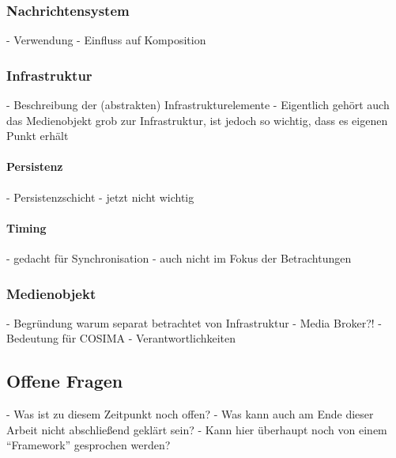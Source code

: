 
\subsubsection{Nachrichtensystem} %
\label{ssub:nachrichtensystem}

  - Verwendung
  - Einfluss auf Komposition


\subsubsection{Infrastruktur} %
\label{ssub:infrastruktur}

  - Beschreibung der (abstrakten) Infrastrukturelemente
  - Eigentlich gehört auch das Medienobjekt grob zur Infrastruktur, ist jedoch so wichtig, dass es eigenen Punkt erhält

\paragraph{Persistenz} %
\label{par:persistenz}

  - Persistenzschicht
  - jetzt nicht wichtig


\paragraph{Timing} %
\label{par:timing}

  - gedacht für Synchronisation
  - auch nicht im Fokus der Betrachtungen



\subsubsection{Medienobjekt} %
\label{ssub:medienobjekt}

  - Begründung warum separat betrachtet von Infrastruktur
  - Media Broker?!
  - Bedeutung für COSIMA
  - Verantwortlichkeiten



\subsection{Offene Fragen} %
\label{sub:offene_fragen}

  - Was ist zu diesem Zeitpunkt noch offen?
  - Was kann auch am Ende dieser Arbeit nicht abschließend geklärt sein?
  - Kann hier überhaupt noch von einem "`Framework"' gesprochen werden?




